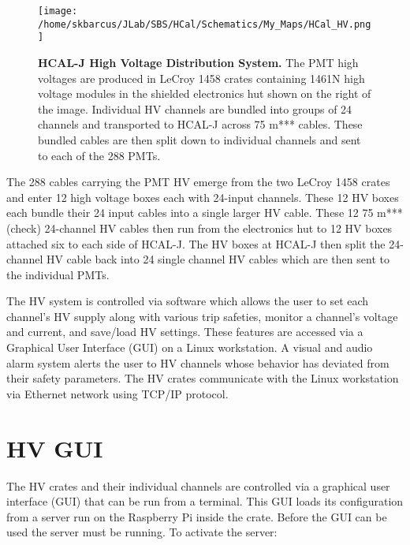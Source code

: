 \documentclass[oneside]{book}   %
\newcommand{\hcal}{HCAL-J\xspace}
\begin{document}
 	\begin{figure}[!ht]
	\begin{center}
	\texttt{[image: /home/skbarcus/JLab/SBS/HCal/Schematics/My\_Maps/HCal\_HV.png]}
	\end{center}
	\caption{
	{\bf{\hcal High Voltage Distribution System.}} The PMT high voltages are produced in LeCroy 1458 crates containing 1461N high voltage modules in the shielded electronics hut shown on the right of the image. Individual HV channels are bundled into groups of 24 channels and transported to \hcal across 75 m*** cables. These bundled cables are then split down to individual channels and sent to each of the 288 PMTs.}
	\label{fig:hv}
	\end{figure}

The 288 cables carrying the PMT HV emerge from the two LeCroy 1458 crates and enter 12 high voltage boxes each with 24-input channels. These 12 HV boxes each bundle their 24 input cables into a single larger HV cable. These 12 75 m***(check) 24-channel HV cables then run from the electronics hut to 12 HV boxes attached six to each side of \hcal. The HV boxes at \hcal then split the 24-channel HV cable back into 24 single channel HV cables which are then sent to the individual PMTs.  

The HV system is controlled via software which allows the user to set each channel's HV supply along with various trip safeties, monitor a channel's voltage and current, and save/load HV settings. These features are accessed via a Graphical User Interface (GUI) on a Linux workstation. A visual and audio alarm system alerts the user to HV channels whose behavior has deviated from their safety parameters. The HV crates communicate with the Linux workstation via Ethernet network using TCP/IP protocol.

\section{HV GUI}
\label{hv_gui}

The HV crates and their individual channels are controlled via a graphical user interface (GUI) that can be run from a terminal. This GUI loads its configuration from a server run on the Raspberry Pi inside the crate. Before the GUI can be used the server must be running. To activate the server:
\end{document}
